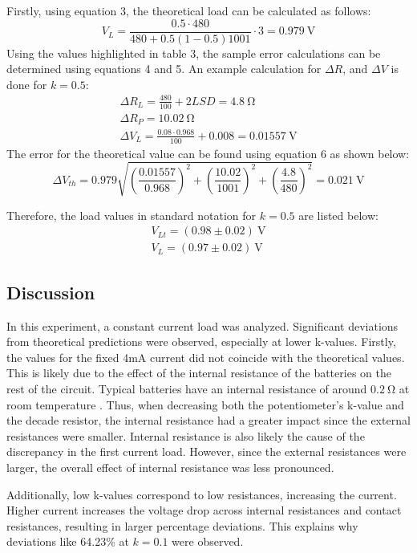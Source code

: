 \documentclass[a4paper]{article}
\newcommand{\unit}[1]{~\mathrm{#1}}
\begin{document}
Firstly, using equation 3, the theoretical load can be calculated as follows:
\[ V_L = \frac{0.5 \cdot 480}{480 + 0.5(1-0.5)1001} \cdot 3 = 0.979\unit{V}\]
Using the values highlighted in table 3, the sample error calculations can be determined 
using equations 4 and 5. An example calculation for $\Delta R$, and $\Delta V$ is done for $k = 0.5$:
\begin{gather*}
    \Delta R_L = \frac{480}{100} + 2LSD = 4.8\unit{\Omega}\\
    \Delta R_P = 10.02\unit{\Omega}\\
    \Delta V_L = \frac{0.08 \cdot 0.968}{100} + 0.008 = 0.01557\unit{V}
\end{gather*}
The error for the theoretical value can be found using equation 6 as shown below:
\[ \Delta V_{th} = 0.979 \sqrt{\left( \frac{0.01557}{0.968} \right) ^2 + \left(
\frac{10.02}{1001} \right) ^2 + \left( \frac{4.8}{480} \right) ^2} = 0.021
\unit{V}\]

Therefore, the load values in standard notation for $ k = 0.5$ are listed below:
\begin{gather*}
    V_{Lt} = (0.98 \pm 0.02)\unit{V}\\
    V_L = (0.97 \pm 0.02)\unit{V}
\end{gather*}
\subsection{Discussion}
In this experiment, a constant current load was analyzed.
Significant deviations from theoretical predictions were observed, especially at lower k-values. 
Firstly, the values for the fixed 4mA current did not coincide with the theoretical values. 
This is likely due to the effect of the internal resistance of the batteries on the rest of the circuit. 
Typical batteries have an internal resistance of around $0.2 \unit{\Omega}$ at room temperature \cite{ir}. 
Thus, when decreasing both the potentiometer's k-value and the decade resistor, 
the internal resistance had a greater impact since the external resistances were smaller.
Internal resistance is also likely the cause of the discrepancy in the first current load. 
However, since the external resistances were larger, the overall effect of internal resistance was less pronounced.

Additionally, low k-values correspond to low resistances, increasing the current. 
Higher current increases the voltage drop across internal resistances and contact resistances, 
resulting in larger percentage deviations. This explains why deviations like 64.23\% at $k = 0.1$ were observed.
\end{document}
